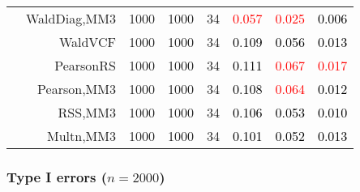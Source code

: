 \documentclass[
]{article}
\begin{document}
\begin{table}[H]
{\begin{tabular}[t]{lrrrrrrr}
\hspace{1em} & WaldDiag,MM3 & 1000 & 1000 & 34 & \textcolor{red}{0.057} & \textcolor{red}{0.025} & \textcolor{black}{0.006}\\

\hspace{1em} & WaldVCF & 1000 & 1000 & 34 & \textcolor{black}{0.109} & \textcolor{black}{0.056} & \textcolor{black}{0.013}\\

\hspace{1em} & PearsonRS & 1000 & 1000 & 34 & \textcolor{black}{0.111} & \textcolor{red}{0.067} & \textcolor{red}{0.017}\\

\hspace{1em} & Pearson,MM3 & 1000 & 1000 & 34 & \textcolor{black}{0.108} & \textcolor{red}{0.064} & \textcolor{black}{0.012}\\

\hspace{1em} & RSS,MM3 & 1000 & 1000 & 34 & \textcolor{black}{0.106} & \textcolor{black}{0.053} & \textcolor{black}{0.010}\\

\hspace{1em} & Multn,MM3 & 1000 & 1000 & 34 & \textcolor{black}{0.101} & \textcolor{black}{0.052} & \textcolor{black}{0.013}\\
\bottomrule
\end{tabular}}
\endgroup{}
\end{table}

\hypertarget{type-i-errors-n2000}{%
\subsubsection{\texorpdfstring{Type I errors
(\(n=2000\))}{Type I errors (n=2000)}}\label{type-i-errors-n2000}}
\end{document}
